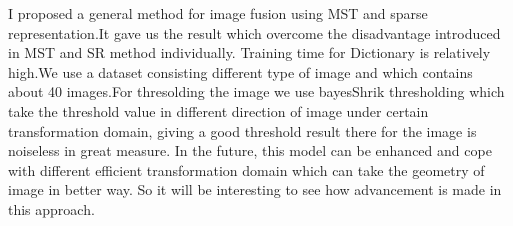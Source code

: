 I proposed a general method for image fusion using MST and sparse representation.It gave us the result which overcome the disadvantage introduced in MST and SR method individually. Training time for Dictionary is relatively high.We use a dataset consisting different type of image and which contains about 40 images.For thresolding the image we use bayesShrik thresholding which take the threshold value in different direction of image under certain transformation domain, 
giving a good threshold result there for the image is noiseless in great measure. In the future, this model can be enhanced and cope
with different efficient transformation domain which can take the geometry of  image in better way. So it will be interesting to see how advancement is made in this approach.